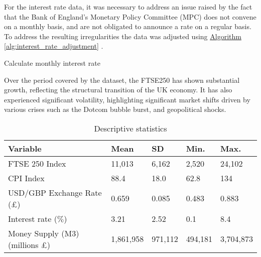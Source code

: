 \documentclass[11pt,a4paper]{article}
\newcommand{\algoref}[1]{%
    \hyperref[alg:#1]{Algorithm \ref{alg:#1}}%
}
\begin{document}
For the interest rate data, it was necessary to address an issue raised by the fact that the Bank of England’s Monetary Policy Committee (MPC) 
does not convene on a monthly basis, and are not obligated to 
announce a rate on a regular basis. To address the resulting irregularities the data was adjusted using \algoref{interest_rate_adjustment}.


\begin{algorithm}[H]
    \caption{Calculate monthly interest rate}
    \label{alg:interest_rate_adjustment}
    
\end{algorithm}


Over the period covered by the dataset, the FTSE250 has 
shown substantial growth, reflecting the structural transition of the UK economy.
It has also experienced significant volatility, highlighting significant market shifts driven by 
various crises such as the Dotcom bubble burst, and geopolitical shocks.

\begin{table}[h!]
    \centering
    \caption{Descriptive statistics}
    \begin{tabular}{lllll}
        \toprule
        \textbf{Variable} & \textbf{Mean} & \textbf{SD} &  \textbf{Min.} & \textbf{Max.}\\
        \midrule
        FTSE 250 Index &  11,013 & 6,162 & 2,520 & 24,102 \\
        CPI Index &  88.4 & 18.0 & 62.8 & 134 \\
        USD/GBP Exchange Rate (£) &  0.659 & 0.085 & 0.483 & 0.883 \\
        Interest rate ($\%$) &  3.21 & 2.52 & 0.1 & 8.4 \\
        Money Supply (M3) (millions £) &  1,861,958 & 971,112 & 494,181 & 3,704,873 \\
        \bottomrule
    \end{tabular}
\end{table}
\end{document}
